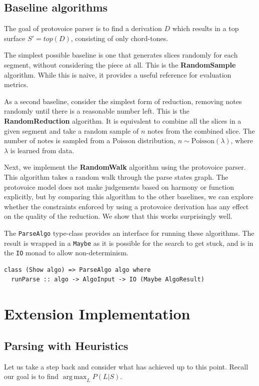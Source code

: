 \documentclass[12pt,a4paper,twoside,openright]{report}
\DeclareMathOperator*{\argmax}{arg\,max}
\theoremstyle{definition}
\begin{document}
\subsection{Baseline algorithms}
The goal of protovoice parser is to find a derivation $D$ which results in a top surface $S' = top(D)$, consisting of only chord-tones. 

The simplest possible baseline is one that generates slices randomly for each segment, without considering the piece at all. This is the \textbf{RandomSample} algorithm. While this is naive, it provides a useful reference for evaluation metrics.

As a second baseline, consider the simplest form of reduction, removing notes randomly until there is a reasonable number left. This is the \textbf{RandomReduction} algorithm.
It is equivalent to combine all the slices in a given segment and take a random sample of $n$ notes from the combined slice. 
The number of notes is sampled from a Poisson distribution, $n \sim \text{Poisson}(\lambda)$, where $\lambda$ is learned from data. 

Next, we implement the \textbf{RandomWalk} algorithm using the protovoice parser. This algorithm takes a random walk through the parse states graph. The protovoice model does not make judgements based on harmony or function explicitly, but by comparing this algorithm to the other baselines, we can explore whether the constraints enforced by using a protovoice derivation has any effect on the quality of the reduction. We show that this works surprisingly well.

The \texttt{ParseAlgo} type-class provides an interface for running these algorithms. The result is wrapped in a \texttt{Maybe} as it is possible for the search to get stuck, and is in the \texttt{IO} monad to allow non-determinism.

\begin{lstlisting}[caption={Algorithm type-class}, captionpos=b]
class (Show algo) => ParseAlgo algo where 
  runParse :: algo -> AlgoInput -> IO (Maybe AlgoResult)
\end{lstlisting}

\section{Extension Implementation}

\subsection{Parsing with Heuristics}
Let us take a step back and consider what has achieved up to this point. Recall our goal is to find $\argmax_L P(L|S)$. 
\end{document}
